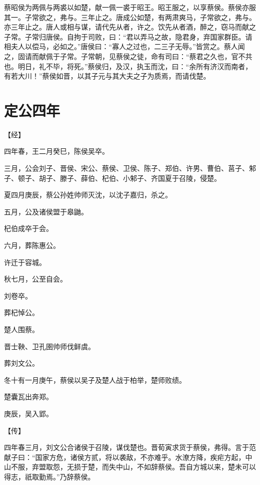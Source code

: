 \documentclass[a4paper,12pt,UTF8,twoside]{ctexbook}
\begin{document}
蔡昭侯为两佩与两裘以如楚，献一佩一裘于昭王。昭王服之，以享蔡侯。蔡侯亦服其一。子常欲之，弗与。三年止之。唐成公如楚，有两肃爽马，子常欲之，弗与。亦三年止之。唐人或相与谋，请代先从者，许之。饮先从者酒，醉之，窃马而献之子常。子常归唐侯。自拘于司败，曰：“君以弄马之故，隐君身，弃国家群臣。请相夫人以偿马，必如之。”唐侯曰：“寡人之过也，二三子无辱。”皆赏之。蔡人闻之，固请而献佩于子常。子常朝，见蔡侯之徒，命有司曰：“蔡君之久也，官不共也。明日，礼不毕，将死。”蔡侯归，及汉，执玉而沈，曰：“余所有济汉而南者，有若大川！”蔡侯如晋，以其子元与其大夫之子为质焉，而请伐楚。

\chapter{定公四年}


【经】

四年春，王二月癸巳，陈侯吴卒。

三月，公会刘子、晋侯、宋公、蔡侯、卫侯、陈子、郑伯、许男、曹伯、莒子、邾子、顿子、胡子、滕子、薛伯、杞伯、小邾子、齐国夏于召陵，侵楚。

夏四月庚辰，蔡公孙姓帅师灭沈，以沈子嘉归，杀之。

五月，公及诸侯盟于皋鼬。

杞伯成卒于会。

六月，葬陈惠公。

许迁于容城。

秋七月，公至自会。

刘卷卒。

葬杞悼公。

楚人围蔡。

晋士鞅、卫孔圉帅师伐鲜虞。

葬刘文公。

冬十有一月庚午，蔡侯以吴子及楚人战于柏举，楚师败绩。

楚囊瓦出奔郑。

庚辰，吴入郢。

【传】

四年春三月，刘文公合诸侯于召陵，谋伐楚也。晋荀寅求货于蔡侯，弗得。言于范献子曰：“国家方危，诸侯方贰，将以袭敌，不亦难乎。水潦方降，疾疟方起，中山不服，弃盟取怨，无损于楚，而失中山，不如辞蔡侯。吾自方城以来，楚未可以得志，祇取勤焉。”乃辞蔡侯。
\end{document}
